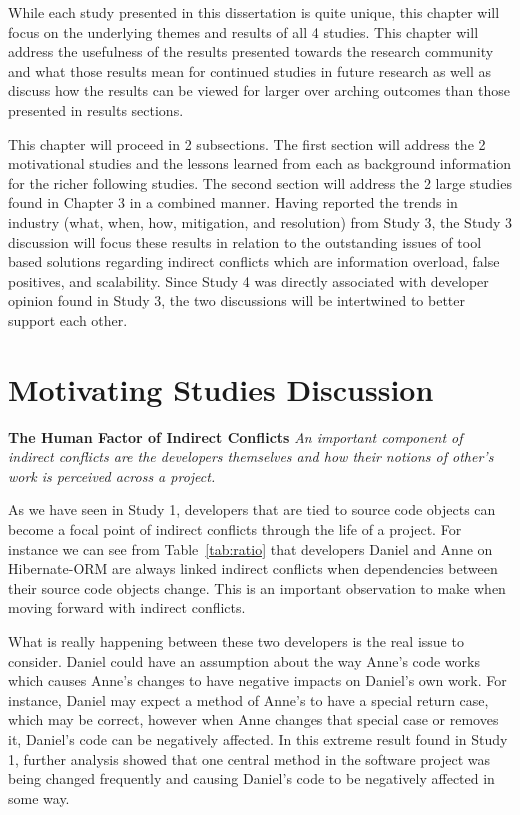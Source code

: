 \label{chapter:discussion}

While each study presented in this dissertation is quite unique, this chapter will focus on the underlying themes and
results of all 4 studies. This chapter will address the usefulness of the results presented towards the
research community and
what those results mean for continued studies in future research as well as discuss how the results can be viewed
for larger over arching outcomes than those presented in results sections. 

This chapter will proceed in 2 subsections. The first section will address the 2 motivational studies and the lessons
learned from each as background information for the richer following studies. The second section will address the 2 large
studies found in Chapter 3 in a combined manner. Having reported the trends in industry (what, when, how, mitigation, and resolution)
from Study 3, the Study 3 discussion will focus these
results in relation to the outstanding issues of tool based solutions regarding indirect conflicts which are information overload,
false positives, and scalability. Since Study 4 was directly associated with developer opinion found in Study
3, the two discussions will be intertwined to better support each other.

\section{Motivating Studies Discussion}

\textbf{The Human Factor of Indirect Conflicts} \textit{An important component of indirect conflicts are the developers
themselves and how their notions of other's work is perceived across a project.}

As we have seen in Study 1, developers that are tied to source code objects can become a focal point of
indirect conflicts through the life of a project. For instance we can see from Table~\ref{tab:ratio} that
developers Daniel and Anne on Hibernate-ORM are always linked indirect conflicts when dependencies between
their source code objects change. This is an important observation to make when moving forward with indirect
conflicts.

What is really happening between these two developers is the real issue to consider. Daniel could have an
assumption about the way Anne's code works which causes Anne's changes to have negative impacts on Daniel's
own work. For instance, Daniel may expect a method of Anne's to have a special return case, which may be correct,
however when Anne changes that special case or removes it, Daniel's code can be negatively affected. In this extreme
result found in Study 1, further analysis showed that one central method in the software project was being changed
frequently and causing Daniel's code to be negatively affected in some way.

